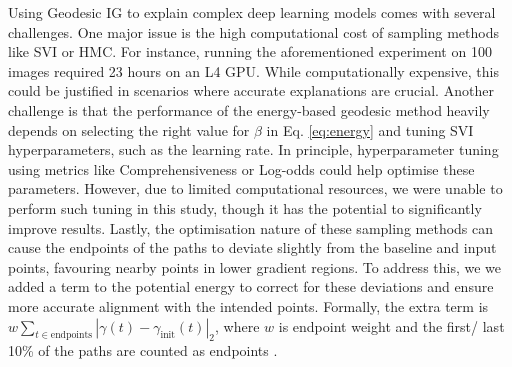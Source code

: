Using Geodesic IG to explain complex deep learning models comes with several challenges. One major issue is the high computational cost of sampling methods like SVI or HMC. For instance, running the aforementioned experiment on 100 images required 23 hours on an L4 GPU. While computationally expensive, this could be justified in scenarios where accurate explanations are crucial. Another challenge is that the performance of the energy-based geodesic method heavily depends on selecting the right value for $\beta$ in Eq. \ref{eq:energy} and tuning SVI hyperparameters, such as the learning rate. In principle, hyperparameter tuning using metrics like Comprehensiveness or Log-odds could help optimise these parameters. However, due to limited computational resources, we were unable to perform such tuning in this study, though it has the potential to significantly improve results. Lastly, the optimisation nature of these sampling methods can cause the endpoints of the paths to deviate slightly from the baseline and input points, favouring nearby points in lower gradient regions. To address this, we we added a term to the potential energy to correct for these deviations and ensure more accurate alignment with the intended points.  Formally, the extra term is $w \sum_{t \in \text{endpoints}} |\gamma(t) - \gamma_{\text{init}}(t)|_2$, where $w$ is endpoint weight and the first/ last 10\% of the paths are counted as endpoints .
